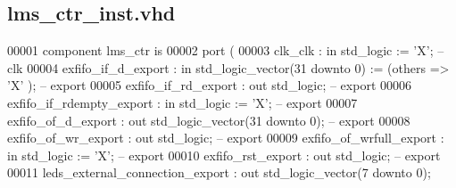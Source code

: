 \subsection{lms\+\_\+ctr\+\_\+inst.\+vhd}
\label{lms__ctr__inst_8vhd_source}

\begin{DoxyCode}
00001     \textcolor{keywordflow}{component} lms_ctr \textcolor{keywordflow}{is}
00002         \textcolor{keywordflow}{port} (
00003             clk_clk                                 : \textcolor{keywordflow}{in}    \textcolor{comment}{std\_logic}                     := 'X';          
         \textcolor{keyword}{-- clk}
00004             exfifo_if_d_export                      : \textcolor{keywordflow}{in}    \textcolor{comment}{std\_logic\_vector}(\textcolor{vhdllogic}{}\textcolor{vhdllogic}{31} \textcolor{keywordflow}{downto} \textcolor{vhdllogic}{}\textcolor{vhdllogic}{0}) := (\textcolor{keywordflow}{others} => 'X'
      ); \textcolor{keyword}{-- export}
00005             exfifo_if_rd_export                     : \textcolor{keywordflow}{out}   \textcolor{comment}{std\_logic};                                     
         \textcolor{keyword}{-- export}
00006             exfifo_if_rdempty_export                : \textcolor{keywordflow}{in}    \textcolor{comment}{std\_logic}                     := 'X';          
         \textcolor{keyword}{-- export}
00007             exfifo_of_d_export                      : \textcolor{keywordflow}{out}   \textcolor{comment}{std\_logic\_vector}(\textcolor{vhdllogic}{}\textcolor{vhdllogic}{31} \textcolor{keywordflow}{downto} \textcolor{vhdllogic}{}\textcolor{vhdllogic}{0});                 
         \textcolor{keyword}{-- export}
00008             exfifo_of_wr_export                     : \textcolor{keywordflow}{out}   \textcolor{comment}{std\_logic};                                     
         \textcolor{keyword}{-- export}
00009             exfifo_of_wrfull_export                 : \textcolor{keywordflow}{in}    \textcolor{comment}{std\_logic}                     := 'X';          
         \textcolor{keyword}{-- export}
00010             exfifo_rst_export                       : \textcolor{keywordflow}{out}   \textcolor{comment}{std\_logic};                                     
         \textcolor{keyword}{-- export}
00011             leds_external_connection_export         : \textcolor{keywordflow}{out}   \textcolor{comment}{std\_logic\_vector}(\textcolor{vhdllogic}{}\textcolor{vhdllogic}{7} \textcolor{keywordflow}{downto} \textcolor{vhdllogic}{}\textcolor{vhdllogic}{0});                  

\end{DoxyCode}
